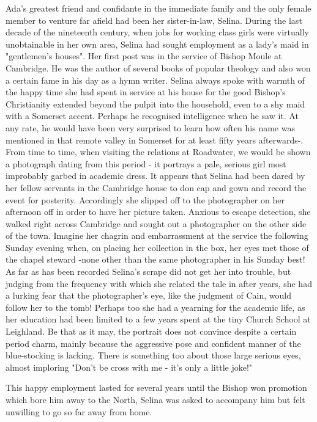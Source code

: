Ada's greatest friend and confidante in the immediate family and the only female member to venture far afield had been her sister-in-law, Selina. During the last decade of the nineteenth century, when jobs for working class girls were virtually unobtainable in her own area, Selina had sought employment as a lady's maid in "gentlemen's houses". Her first post was in the service of Bishop Moule at Cambridge. He was the author of several books of popular theology and also won a certain fame in his day as a hymn writer. Selina always spoke with warmth of the happy time she had spent in service at his house for the good Bishop's Christianity extended beyond the pulpit into the household, even to a shy maid with a Somerset accent. Perhaps he recognised intelligence when he saw it. At any rate, he would have been very surprised to learn how often his name was mentioned in that remote valley in Somerset for at least fifty years afterwards-. From time to time, when visiting the relations at Roadwater, we would be shown a photograph dating from this period - it portrays a pale, serious girl most improbably garbed in academic dress. It appears that Selina had been dared by her fellow servants in the Cambridge house to don cap and gown and record the event for posterity. Accordingly she slipped off to the photographer on her afternoon off in order to have her picture taken. Anxious to escape detection, she walked right across Cambridge and sought out a photographer on the other side of the town. Imagine her chagrin and embarrassment at the service the following Sunday evening when, on placing her collection in the box, her eyes met those of the chapel steward -none other than the same photographer in his Sunday best! As far as has been recorded Selina’s scrape did not get her into trouble, but judging from the frequency with which she related the tale in after years, she had a lurking fear that the photographer's eye, like the judgment of Cain, would follow her to the tomb! Perhaps too she had a yearning for the academic life, as her education had been limited to a few years spent at the tiny Church School at Leighland. Be that as it may, the portrait does not convince despite a certain period charm, mainly because the aggressive pose and confident manner of the blue-stocking is lacking. There is something too about those large serious eyes, almost imploring "Don't be cross with me - it's only a little joke!"

This happy employment lasted for several years until the Bishop won promotion which bore him away to the North, Selina was asked to accompany him but felt unwilling to go so far away from home.

